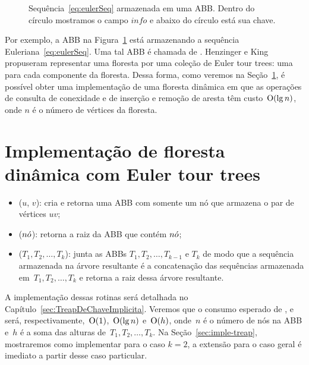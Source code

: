 \begin{figure}[htb]
\centering
\caption{Sequência~\eqref{eq:eulerSeq}  armazenada em uma ABB. Dentro do círculo mostramos o campo $info$ e abaixo do círculo está sua chave.}
\label{fig:seq-treap-indices}
\end{figure}

Por exemplo, a ABB na Figura~\ref{fig:seq-treap-indices} está armazenando a sequência Euleriana~\eqref{eq:eulerSeq}.
Uma tal ABB é chamada de . 
Henzinger e King propuseram representar uma floresta por uma coleção de Euler tour trees: uma para cada componente da floresta. 
Dessa forma, como veremos na Seção~\ref{sec:impleDF-ETT}, é possível obter uma implementação de uma floresta dinâmica em que as operações de consulta de conexidade e de inserção e remoção de aresta têm custo~$\mathrm{O}(\lg n)$, onde $n$ é o número de vértices da floresta.


\section{Implementação de floresta dinâmica com Euler tour trees}
\label{sec:impleDF-ETT}


\begin{itemize}
\item  \treapCreate($u$, $v$): cria e retorna uma ABB com somente um nó que armazena o par de vértices $uv$;
\item \treapGetRoot($n\acute{o}$): retorna a raiz da ABB que contém $n\acute{o}$;
\item \treapJoin($T_1, T_2, \ldots, T_k$): junta as ABBs $T_1, T_2, \ldots, T_{k-1}$ e $T_k$ de modo que a sequência armazenada na árvore resultante é a concatenação das sequências armazenada em~$T_1, T_2, \ldots, T_k$ e retorna a raiz dessa árvore resultante.
\end{itemize}

A implementação dessas rotinas será detalhada no Capítulo~\ref{sec:TreapDeChaveImplicita}. Veremos que o consumo esperado de \treapCreate, \treapGetRoot{} e \treapJoin{} será, respectivamente,~$\mathrm{O}(1)$,~$\mathrm{O}(\lg n)$ e~$\mathrm{O}(h)$, onde~$n$ é o número de nós na ABB e~$h$ é a soma das alturas de~$T_1, T_2, \ldots, T_k$. Na Seção~\ref{sec:imple-treap}, mostraremos como implementar \treapJoin{} para o caso $k=2$, a extensão para o caso geral é imediato a partir desse caso particular.

